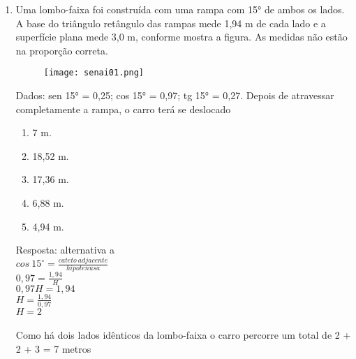 \documentclass[a4paper,14pt]{article}
\begin{document}
\begin{enumerate}
        \item Uma lombo-faixa foi construída com uma rampa com 15° de ambos os lados. A base do triângulo
        retângulo das rampas mede 1,94 m de cada lado e a superfície plana mede 3,0 m, conforme mostra a
        figura. As medidas não estão na proporção correta.
        \begin{figure}[h] %
        	\centering
        	\texttt{[image: senai01.png]} %
        \end{figure}
        \newline
        Dados: sen 15° = 0,25;
        cos 15° = 0,97;
        tg 15° = 0,27.
        \newline
        \newline
        Depois de atravessar completamente a rampa, o carro terá se deslocado
        \begin{enumerate}
        	\item 7 m.
        	\item 18,52 m.
        	\item 17,36 m.
        	\item 6,88 m.
        	\item 4,94 m.
        \end{enumerate}
        Resposta: alternativa a \\
        \newline
        $cos~15^{\circ} = \frac{cateto~adjacente}{hipotenusa}$ \\
        $0,97 = \frac{1,94}{H}$ \\
        $0,97 H = 1,94 $ \\
        $H = \frac{1,94}{0,97} $ \\
        $H = 2$ \\ \\
        Como há dois lados idênticos da lombo-faixa o carro percorre um total de 2 + 2 + 3 = 7 metros
        
        
    	\vspace{0cm}
    	

\end{enumerate}
\end{document}
